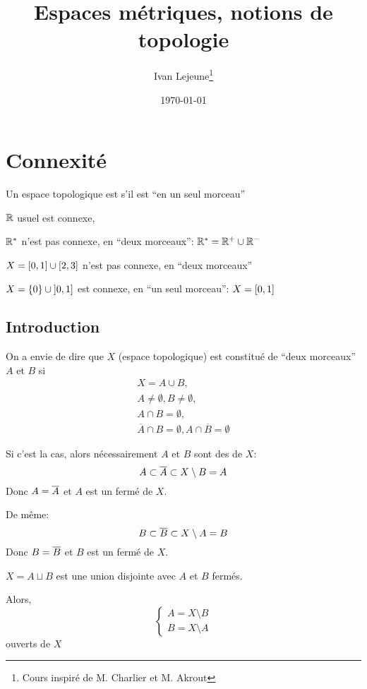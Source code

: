 \documentclass[french,a4paper,10pt]{article}
\title{\color{astral} \sffamily \bfseries Espaces métriques, notions de topologie}
\author{Ivan Lejeune\thanks{Cours inspiré de M. Charlier et M. Akrout}}
\date{\today}
\begin{document}
	\maketitle
	
	\section{Connexité}
	
	\begin{remark}[Idée]
		Un espace topologique est  s'il est ``en un seul morceau''
	\end{remark}
	
	\begin{example}
		$\mathbb{R}$ usuel est connexe,

		$\mathbb{R}^\ast$ n'est pas connexe, en ``deux morceaux'': $\mathbb{R}^\ast= \mathbb{R}^+ \cup \mathbb{R}^-$

		$X = \mathopen{[}0,1\mathclose{]} \cup \mathopen{[}2,3\mathclose{]}$ n'est pas connexe, en ``deux morceaux''

		$X = \{0\} \cup \mathopen{]}0,1\mathclose{]}$ est connexe, en ``un seul morceau'': $X=\mathopen{[}0,1\mathclose{]}$
	\end{example}
	
	\medskip

	\subsection{Introduction}

	On a envie de dire que $X$ (espace topologique) est constitué de ``deux morceaux'' $A$ et $B$
	si 
	\[\begin{gathered}
		X=A\cup B,\\
		A\neq\emptyset, B\neq\emptyset,\\
		A\cap B=\emptyset,\\
		\overline{A}\cap B=\emptyset, A\cap\overline{B}=\emptyset
	\end{gathered}\]
	
	Si c'est la cas, alors nécessairement $A$ et $B$ sont des  de $X$:
	\[
		A\subset \overline{A}\subset X\setminus B=A
	\]
	Donc $A=\overline{A}$ et $A$ est un fermé de $X$.

	De même:
	\[
		B\subset \overline{B}\subset X\setminus A=B
	\]
	Donc $B=\overline{B}$ et $B$ est un fermé de $X$.

	$X=A\sqcup B$ est une union disjointe avec $A$ et $B$ fermés.

	Alors, 
	\[\begin{cases}
		A = X\setminus B\\
		B = X\setminus A
	\end{cases}\]
	ouverts de $X$
\end{document}
